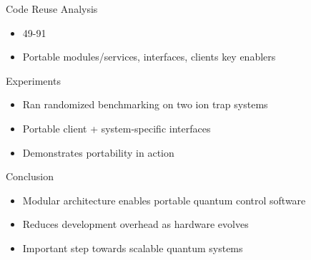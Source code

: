 \documentclass[18 pt]{beamer}
\begin{document}
\begin{frame}{Code Reuse Analysis}
\begin{itemize}
\item 49-91%
\item Portable modules/services, interfaces, clients key enablers
\end{itemize}
\end{frame}

\begin{frame}{Experiments}
\begin{itemize}
\item Ran randomized benchmarking on two ion trap systems
\item Portable client + system-specific interfaces
\item Demonstrates portability in action
\end{itemize}
\end{frame}

\begin{frame}{Conclusion}
\begin{itemize}
\item Modular architecture enables portable quantum control software
\item Reduces development overhead as hardware evolves
\item Important step towards scalable quantum systems
\end{itemize}

\end{frame}
\end{document}
